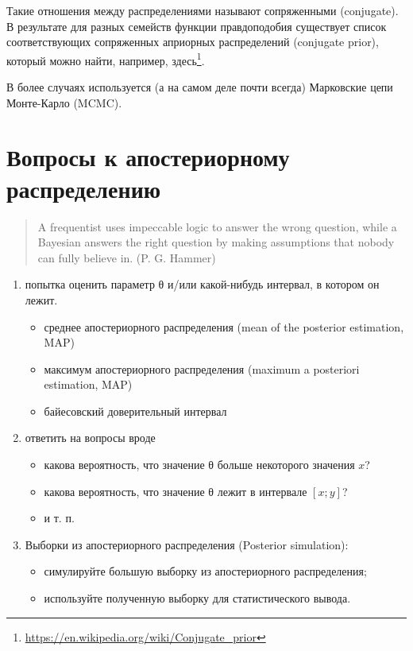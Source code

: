 \documentclass[
]{book}
\providecommand{\tightlist}{%
  \setlength{\itemsep}{0pt}\setlength{\parskip}{0pt}}
\renewcommand{\href}[2]{#2\footnote{\url{#1}}}
\begin{document}
Такие отношения между распределениями называют сопряженными (conjugate). В результате для разных семейств функции правдоподобия существует список соответствующих сопряженных априорных распределений (conjugate prior), который можно найти, например, \href{https://en.wikipedia.org/wiki/Conjugate_prior}{здесь}.

В более случаях используется (а на самом деле почти всегда) Марковские цепи Монте-Карло (MCMC).

\hypertarget{ux432ux43eux43fux440ux43eux441ux44b-ux43a-ux430ux43fux43eux441ux442ux435ux440ux438ux43eux440ux43dux43eux43cux443-ux440ux430ux441ux43fux440ux435ux434ux435ux43bux435ux43dux438ux44e}{%
\section{Вопросы к апостериорному распределению}\label{ux432ux43eux43fux440ux43eux441ux44b-ux43a-ux430ux43fux43eux441ux442ux435ux440ux438ux43eux440ux43dux43eux43cux443-ux440ux430ux441ux43fux440ux435ux434ux435ux43bux435ux43dux438ux44e}}

\begin{quote}
A frequentist uses impeccable logic to answer the wrong question, while a Bayesian answers the right question by making assumptions that nobody can fully believe in. (P. G. Hammer)
\end{quote}

\begin{enumerate}
\def\labelenumi{\arabic{enumi})}
\tightlist
\item
  попытка оценить параметр θ и/или какой-нибудь интервал, в котором он лежит.

  \begin{itemize}
  \tightlist
  \item
    среднее апостериорного распределения (mean of the posterior estimation, MAP)
  \item
    максимум апостериорного распределения (maximum a posteriori estimation, MAP)
  \item
    байесовский доверительный интервал
  \end{itemize}
\item
  ответить на вопросы вроде

  \begin{itemize}
  \tightlist
  \item
    какова вероятность, что значение θ больше некоторого значения \(x\)?
  \item
    какова вероятность, что значение θ лежит в интервале \([x; y]\)?
  \item
    и т. п.
  \end{itemize}
\item
  Выборки из апостериорного распределения (Posterior simulation):

  \begin{itemize}
  \tightlist
  \item
    симулируйте большую выборку из апостериорного распределения;
  \item
    используйте полученную выборку для статистического вывода.
  \end{itemize}
\end{enumerate}
\end{document}

